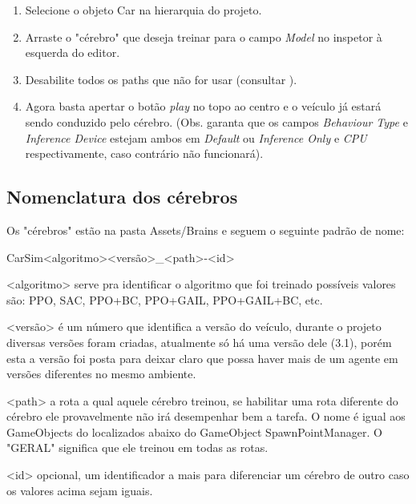 \begin{apendicesenv}
\begin{enumerate}
    \item Selecione o objeto Car na hierarquia do projeto.
    \item Arraste o "cérebro" que deseja treinar para o campo \textit{Model} no inspetor à esquerda do editor.
    \item Desabilite todos os paths que não for usar (consultar ).
    \item Agora basta apertar o botão \textit{play} no topo ao centro e o veículo já estará sendo conduzido pelo cérebro. (Obs. garanta que os campos \textit{Behaviour Type} e \textit{Inference Device} estejam ambos em \textit{Default}  ou  \textit{Inference Only} e \textit{CPU} respectivamente, caso contrário não funcionará).
\end{enumerate}

\subsection*{Nomenclatura dos cérebros}\label{nomenclatura}
Os "cérebros" estão na pasta Assets/Brains e seguem o seguinte padrão de nome:

CarSim<algoritmo><versão>\_<path>-<id>

<algoritmo> serve pra identificar o algoritmo que foi treinado possíveis valores são: PPO, SAC, PPO+BC, PPO+GAIL, PPO+GAIL+BC, etc. 

<versão> é um número que identifica a versão do veículo, durante o projeto diversas versões foram criadas, atualmente só há uma versão dele (3.1), porém esta a versão foi posta para deixar claro que possa haver mais de um agente em versões diferentes no mesmo ambiente.

<path> a rota a qual aquele cérebro treinou, se habilitar uma rota diferente do cérebro ele provavelmente não irá desempenhar bem a tarefa. O nome é igual aos GameObjects do localizados abaixo do GameObject SpawnPointManager. O "GERAL" significa que ele treinou em todas as rotas.

<id> opcional, um identificador a mais para diferenciar um cérebro de outro caso os valores acima sejam iguais.



\end{apendicesenv}
